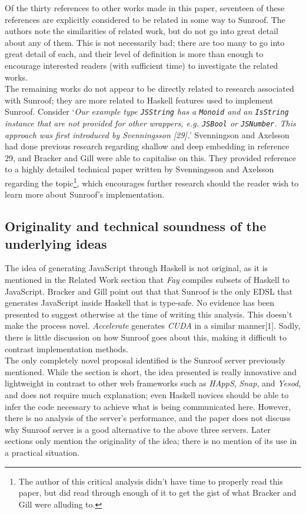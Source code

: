 \documentclass[9pt]{report}
\begin{document}
\noindent
Of the thirty references to other works made in this paper, seventeen of these references are explicitly considered to be related in some way to Sunroof.
The authors note the similarities of related work, but do not go into great detail about any of them.
This is not necessarily bad; there are too many to go into great detail of each, and their level of definition is more than enough to encourage interested readers (with sufficient time) to investigate the related works.\\

The remaining works do not appear to be directly related to research associated with Sunroof; they are more related to Haskell features used to implement Sunroof.
Consider `{\it Our example type \verb/JSString/ has a \verb/Monoid/ and an \verb/IsString/ instance that are not provided for other wrappers, e.g. \verb/JSBool/ or \verb/JSNumber/. This approach was first introduced by Svenningsson [29].}'
Svenningson and Axelsson had done previous research regarding shallow and deep embedding in reference 29, and Bracker and Gill were able to capitalise on this. They provided reference to a highly detailed technical paper written by Svenningsson and Axelsson regarding the topic\footnote{The author of this critical analysis didn't have time to properly read this paper, but did read through enough of it to get the gist of what Bracker and Gill were alluding to.}, which encourages further research should the reader wish to learn more about Sunroof's implementation.

\subsection*{Originality and technical soundness of the underlying ideas}
The idea of generating JavaScript through Haskell is not original, as it is mentioned in the Related Work section that {\it Fay} compiles subsets of Haskell to JavaScript.
Bracker and Gill point out that that Sunroof is the only EDSL that generates JavaScript inside Haskell that is type-safe.
No evidence has been presented to suggest otherwise at the time of writing this analysis.
This doesn't make the process novel.
{\it Accelerate} generates {\it CUDA} in a similar manner[1].
Sadly, there is little discussion on how Sunroof goes about this, making it difficult to contrast implementation methods.\\

\noindent
The only completely novel proposal identified is the Sunroof server previously mentioned.
While the section is short, the idea presented is really innovative and lightweight in contrast to other web frameworks such as {\it HAppS}, {\it Snap}, and {\it Yesod}, and does not require much explanation; even Haskell novices should be able to infer the code necessary to achieve what is being communicated here.
However, there is no analysis of the server's performance, and the paper does not discuss why Sunroof server is a good alternative to the above three servers.
Later sections only mention the originality of the idea; there is no mention of its use in a practical situation.\\
\end{document}

